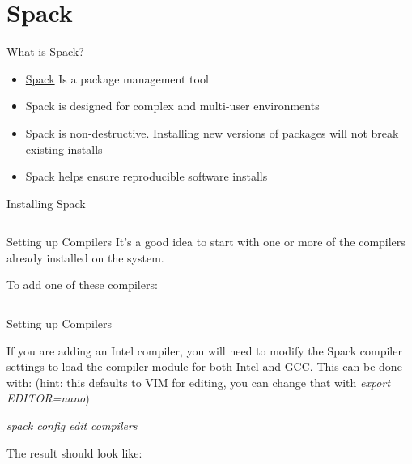 \section{Spack}

\begin{frame}{What is Spack?}
	\begin{itemize}
		\item  \href{https://spack.readthedocs.io/en/latest/index.html}{Spack}   Is a package management tool
		\item Spack is designed for complex and multi-user environments
		\item Spack is non-destructive. Installing new versions of packages will not break existing installs
		\item Spack helps ensure reproducible software installs
	\end{itemize}
\end{frame}

\begin{frame}{Installing Spack}
	\begin{listing}[H]
		\inputminted{Dockerfile}{examples/spack/spack_install.sh}
		\caption{Example of installing Spack. \\ *NOTE: we have Spack installed as a module on M2, this is mostly to make it easy for users to load software that we have installed using Spack. If you try to install software with the Spack module, you may encounter permission issues, so it is advisable to install your own version.}
	\end{listing}
\end{frame}

\begin{frame}{Setting up Compilers}
	It's a good idea to start with one or more of the compilers already installed on the system.
	
	To add one of these compilers:

	\begin{listing}[H]
		\inputminted{Dockerfile}{examples/spack/add_compiler.sh}
		\caption{Example of adding a compiler to Spack.}
	\end{listing}
   
\end{frame}

\begin{frame}{Setting up Compilers}
	
	If you are adding an Intel compiler, you will need to modify the Spack compiler settings to load the compiler module for both Intel and GCC. This can be done with: (hint: this defaults to VIM for editing, you can change that with \textit{export EDITOR=nano})
	
	\textit{spack config edit compilers}
	
	The result should look like:
	
	\begin{listing}[H]
		\inputminted{Dockerfile}{examples/spack/add_intel_compiler.sh}
		\caption{Example of modified Intel configuration.}
	\end{listing}
	
\end{frame}

